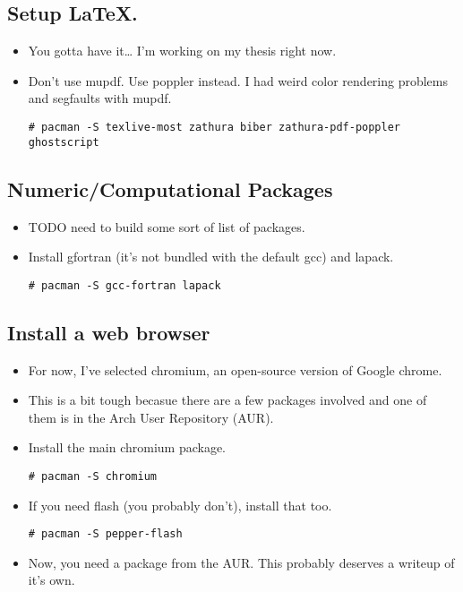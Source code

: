 \documentclass{article}
\begin{document}
  \subsection{Setup \LaTeX.}
    \begin{itemize}
      \item You gotta have it\ldots{} I'm working on my thesis right now.
      \item Don't use mupdf. Use poppler instead. I had weird color rendering
        problems and segfaults with mupdf.
\begin{verbatim}
# pacman -S texlive-most zathura biber zathura-pdf-poppler ghostscript
\end{verbatim}
    \end{itemize}

  \subsection{Numeric/Computational Packages}
    \begin{itemize}
      \item TODO need to build some sort of list of packages.
      \item Install gfortran (it's not bundled with the default gcc) and lapack.
\begin{verbatim}
# pacman -S gcc-fortran lapack
\end{verbatim}
    \end{itemize}

  \subsection{Install a web browser}
    \begin{itemize}
      \item For now, I've selected chromium, an open-source version of Google
        chrome.
      \item This is a bit tough becasue there are a few packages involved and
        one of them is in the Arch User Repository (AUR).
      \item Install the main chromium package.
\begin{verbatim}
# pacman -S chromium
\end{verbatim}
      \item If you need flash (you probably don't), install that too.
\begin{verbatim}
# pacman -S pepper-flash
\end{verbatim}
      \item Now, you need a package from the AUR. This probably deserves a
        writeup of it's own.
    \end{itemize}
\end{document}
